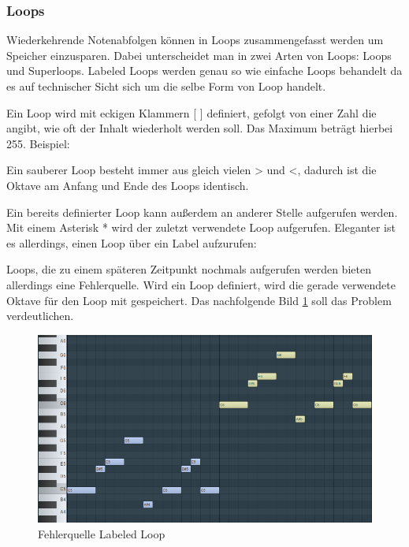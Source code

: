 \subsubsection{Loops}

Wiederkehrende Notenabfolgen können in Loops zusammengefasst werden um Speicher einzusparen. Dabei unterscheidet man in zwei Arten von Loops: Loops und Superloops. Labeled Loops werden genau so wie einfache Loops behandelt da es auf technischer Sicht sich um die selbe Form von Loop handelt.


Ein Loop wird mit eckigen Klammern [ ] definiert, gefolgt von einer Zahl die angibt, wie oft der Inhalt wiederholt werden soll. Das Maximum beträgt hierbei 255. Beispiel:

\medskip



\medskip

Ein sauberer Loop besteht immer aus gleich vielen > und <, dadurch ist die Oktave am Anfang und Ende des Loops identisch.

\bigskip

Ein bereits definierter Loop kann außerdem an anderer Stelle aufgerufen werden. Mit einem Asterisk \** wird der zuletzt verwendete Loop aufgerufen. Eleganter ist es allerdings, einen Loop über ein Label aufzurufen:

\medskip



\medskip


Loops, die zu einem späteren Zeitpunkt nochmals aufgerufen werden bieten allerdings eine Fehlerquelle. Wird ein Loop definiert, wird die gerade verwendete Oktave für den Loop mit gespeichert.
Das nachfolgende Bild \ref{LabeledLoop} soll das Problem verdeutlichen.

\begin{figure}[htbp] \centering
	\includegraphics[width=.95\linewidth]{images/LabeledLoop1.png}
	\caption{Fehlerquelle Labeled Loop}
	\label{LabeledLoop}
\end{figure}

